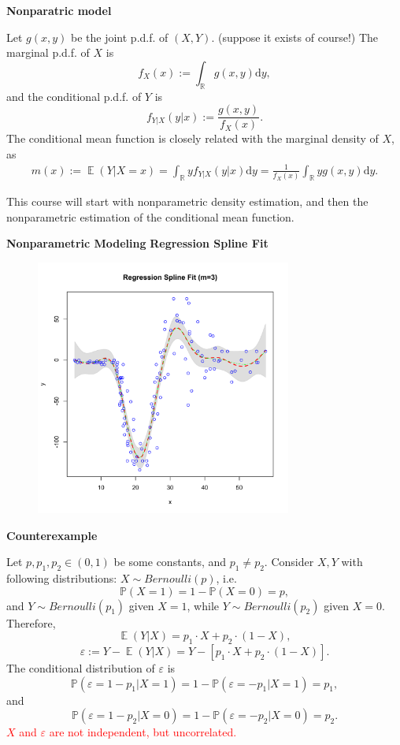 \documentclass[19pt,landscaoe]{article}
\newcommand{\IP}{\mathbb{P}}
\DeclareMathOperator{\E}{\mathbb{E}}
\newcommand{\R}{\mathbb{R}}
\begin{document}
\newpage
{\LARGE{\textbf{Nonparatric model}}}
\vskip15pt
\begin{minipage}{.9\textwidth}
    \Large 
Let $g(x,y)$ be the joint p.d.f. of $(X,Y)$. (suppose it exists of course!) The marginal p.d.f. of $X$ is 
$$f_X(x):=\int_{\R}g(x,y)\mathrm{d}y,$$
and the conditional p.d.f. of $Y$ is 
$$f_{Y|X}(y|x):=\frac{g(x,y)}{f_X(x)}.$$
The conditional mean function is closely related with the marginal density of $X$, as 
\begin{eqnarray*}
    m(x):=\E(Y|X=x)=\int_{\R}yf_{Y|X}(y|x)\mathrm{d}y=\frac1{f_X(x)}\int_{\R}yg(x,y)\mathrm{d}y.
\end{eqnarray*}

This course will start with nonparametric density estimation, and then the nonparametric estimation of the conditional mean function. 
\end{minipage}


\newpage
{\LARGE{\textbf{Nonparametric Modeling}}}
\vskip25pt
{\Large\bf{Regression Spline Fit}}

\begin{figure}[h]
\centering
      \includegraphics[width=0.75\textwidth,height=0.52\textwidth]{splinefit.pdf}
    \label{figure4} 

\end{figure}
\newpage
{\LARGE\centerline{\textbf{Counterexample}}}
\vskip25pt
\begin{minipage}{.9\textwidth}
    \Large 
    Let $p,p_1,p_2\in(0,1)$ be some constants, and $p_1\ne p_2$. Consider $X,Y$ with following distributions: 
$X\sim Bernoulli(p)$, i.e. 
$$\IP(X=1)=1-\IP(X=0)=p,$$
and $Y\sim Bernoulli(p_1)$ given $X=1$, while $Y\sim Bernoulli(p_2)$ given $X=0$. Therefore, 
$$\E(Y|X)=p_1\cdot X+p_2\cdot(1-X),$$
$$\varepsilon:=Y-\E(Y|X)=Y-[p_1\cdot X+p_2\cdot(1-X)].$$
The conditional distribution of $\varepsilon$ is
$$\IP(\varepsilon=1-p_1|X=1)=1-\IP(\varepsilon=-p_1|X=1)=p_1,$$
and  
$$\IP(\varepsilon=1-p_2|X=0)=1-\IP(\varepsilon=-p_2|X=0)=p_2.$$
\textcolor{red}{$X$ and $\varepsilon$ are not independent, but uncorrelated.}
\end{minipage}
\end{document}

